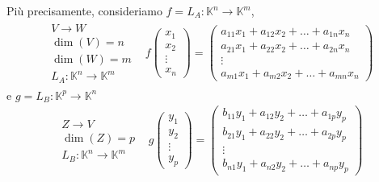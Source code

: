 \documentclass{book}
\begin{document}
Più precisamente, consideriamo $f=L_A:\mathbb{K}^n\to \mathbb{K}^m$,
\begin{eqnarray}
  \begin{matrix}
    V\to W\\
    \dim (V)=n\\
    \dim (W)=m\\
    L_A:\mathbb{K}^n\to \mathbb{K}^m
  \end{matrix} & f
                 \begin{pmatrix}
                   x_1\\
                   x_2\\
                   \vdots\\
                   x_n
                 \end{pmatrix} =
                 \begin{pmatrix}
                   a_{11}x_1+a_{12}x_2+\dots+a_{1n}x_n\\
                   a_{21}x_1+a_{22}x_2+\dots+a_{2n}x_n\\
                   \vdots\\
                   a_{m1}x_1+a_{m2}x_2+\dots+a_{mn}x_n
                 \end{pmatrix}
\end{eqnarray}
e $g=L_B:\mathbb{K}^p\to \mathbb{K}^n$
\begin{eqnarray}
  \begin{matrix}
    Z\to V\\
    \dim (Z)=p\\
    L_B:\mathbb{K}^n\to \mathbb{K}^m
  \end{matrix} & g
                 \begin{pmatrix}
                   y_1\\
                   y_2\\
                   \vdots\\
                   y_p
                 \end{pmatrix} =
                 \begin{pmatrix}
                   b_{11}y_1+a_{12}y_2+\dots+a_{1p}y_p\\
                   b_{21}y_1+a_{22}y_2+\dots+a_{2p}y_p\\
                   \vdots\\
                   b_{n1}y_1+a_{n2}y_2+\dots+a_{np}y_p
                 \end{pmatrix}
\end{eqnarray}
\end{document}
